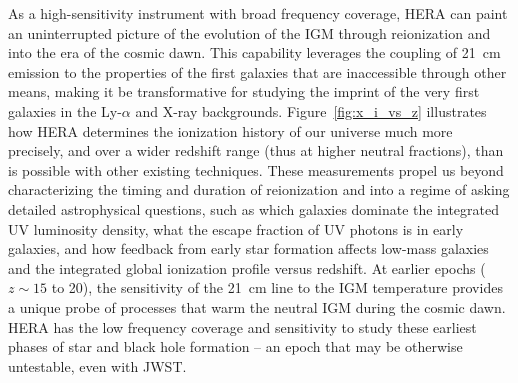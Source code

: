 \documentclass[preprint]{aastex}
\newcommand{\compress}{\vspace{-0.3in}}
\begin{document}
As a high-sensitivity instrument with broad frequency coverage, HERA can
paint an uninterrupted picture of the evolution of the IGM through reionization and into the era of the cosmic dawn.
This capability leverages the coupling of
21~cm emission to the properties of the first galaxies that
are inaccessible through other means, making it be transformative for
studying the imprint of the very first galaxies in the Ly-$\alpha$ and X-ray backgrounds.
Figure~\ref{fig:x_i_vs_z} illustrates how HERA
determines the ionization history of our universe much more precisely,
and over a wider redshift range (thus at higher neutral fractions), than is possible with other existing techniques.
These measurements propel us beyond characterizing the timing and duration of reionization and into a regime
of asking detailed astrophysical questions, such as which galaxies dominate the integrated UV luminosity density, what the escape fraction
of UV photons is in early galaxies, and how feedback from early star formation affects low-mass galaxies and
the integrated  global ionization profile versus redshift.
At earlier epochs ($z \sim 15$ to 20), the sensitivity of the 21~cm line
to the IGM temperature provides a unique probe of processes that warm the neutral IGM during the cosmic dawn.
HERA has the low frequency coverage and
sensitivity to study these earliest phases of star and black hole formation -- an epoch that may be otherwise
untestable, even with JWST.

\end{document}
